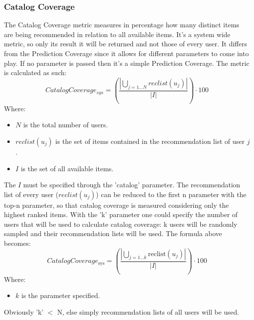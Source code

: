 \documentclass[11pt]{article}
\begin{document}
\subsubsection{Catalog Coverage}\label{sec:cat_cov}
The Catalog Coverage metric measures in percentage how many distinct items are being recommended in relation
to all available items. It's a system wide metric, so only its result it will be returned and not those of every
user. It differs from the Prediction Coverage since it allows for different parameters to come into play. If no
parameter is passed then it's a simple Prediction Coverage.
The metric is calculated as such:
\hfill\break
\hfill\break
    \[
         Catalog Coverage_{sys} = (\frac{|\bigcup_{j=1...N}reclist(u_j)|}{|I|})\cdot100
    \]
\hfill\break
\hfill\break
    Where:
\begin{itemize}
    \item $N$ is the total number of users.
    \item $reclist(u_j)$ is the set of items contained in the recommendation list of user $j$.
    \item $I$ is the set of all available items.
\end{itemize}
\hfill\break
\hfill\break
The $I$ must be specified through the 'catalog' parameter. The recommendation list of every user ($reclist(u_j)$)
can be reduced to the first n parameter with the top-n parameter, so that catalog coverage is measured considering
only the highest ranked items. With the 'k' parameter one could specify the number of users that will be used to
calculate catalog coverage: k users will be randomly sampled and their recommendation lists will be used.
The formula above becomes:
\hfill\break
\hfill\break
    \[
        Catalog Coverage_{\text{sys}} = \left(\frac{|\bigcup_{j=1\ldots k} \text{reclist}(u_j)|}{|I|}\right) \cdot 100
    \]
\hfill\break
\hfill\break
    Where:
\begin{itemize}
    \item $k$ is the parameter specified.
\end{itemize}
\hfill\break
\hfill\break
Obviously 'k' $<$ N, else simply recommendation lists of all users will be used.
\hfill\break
\hfill\break


\end{document}
